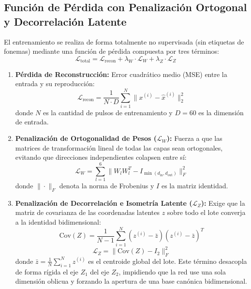 \documentclass[11pt,a4paper]{article}
\begin{document}
\subsection{Función de Pérdida con Penalización Ortogonal y Decorrelación Latente}
\label{subsec:perdida_ortogonal}

El entrenamiento se realiza de forma totalmente no supervisada (sin etiquetas de fonemas) mediante una función de pérdida compuesta por tres términos:
\begin{equation}
    \mathcal{L}_{\text{total}} = \mathcal{L}_{\text{recon}} + \lambda_W \cdot \mathcal{L}_W + \lambda_Z \cdot \mathcal{L}_Z
    \label{eq:loss_total}
\end{equation}

\begin{enumerate}
    \item \textbf{Pérdida de Reconstrucción:} Error cuadrático medio (MSE) entre la entrada y su reproducción:
    \begin{equation}
        \mathcal{L}_{\text{recon}} = \frac{1}{N \cdot D} \sum_{i=1}^N \|x^{(i)} - \hat{x}^{(i)}\|_2^2
    \end{equation}
    donde $N$ es la cantidad de pulsos de entrenamiento y $D = 60$ es la dimensión de entrada.
    \item \textbf{Penalización de Ortogonalidad de Pesos ($\mathcal{L}_W$):} Fuerza a que las matrices de transformación lineal de todas las capas sean ortogonales, evitando que direcciones independientes colapsen entre sí:
    \begin{equation}
        \mathcal{L}_W = \sum_{l=1}^6 \|W_l W_l^T - I_{\min(d_{\text{in}}, d_{\text{out}})}\|_F^2
    \end{equation}
    donde $\|\cdot\|_F$ denota la norma de Frobenius y $I$ es la matriz identidad.
    \item \textbf{Penalización de Decorrelación e Isometría Latente ($\mathcal{L}_Z$):} Exige que la matriz de covarianza de las coordenadas latentes $z$ sobre todo el lote converja a la identidad bidimensional:
    \begin{equation}
        \text{Cov}(Z) = \frac{1}{N - 1} \sum_{i=1}^N (z^{(i)} - \bar{z})(z^{(i)} - \bar{z})^T
    \end{equation}
    \begin{equation}
        \mathcal{L}_Z = \|\text{Cov}(Z) - I_2\|_F^2
    \end{equation}
    donde $\bar{z} = \frac{1}{N} \sum_{i=1}^N z^{(i)}$ es el centroide global del lote. Este término desacopla de forma rígida el eje $Z_1$ del eje $Z_2$, impidiendo que la red use una sola dimensión oblicua y forzando la apertura de una base canónica bidimensional.
\end{enumerate}
\end{document}
